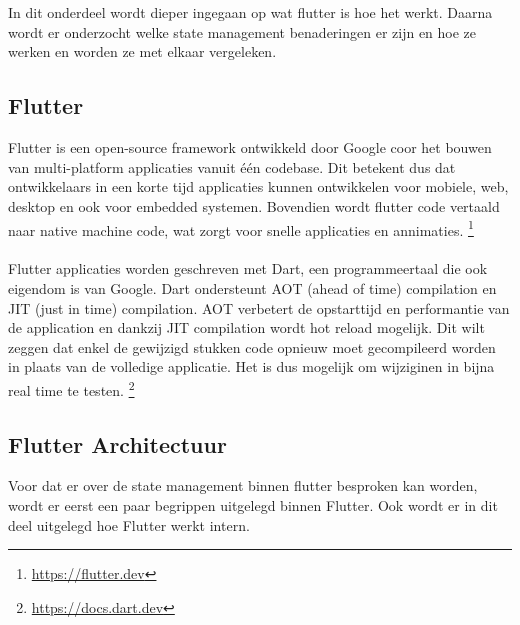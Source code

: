 \chapter{}%
\label{ch:stand-van-zaken}

In dit onderdeel wordt dieper ingegaan op wat flutter is hoe het werkt. Daarna wordt er onderzocht welke state management benaderingen er 
zijn en hoe ze werken en worden ze met elkaar vergeleken.

\section{{Flutter}}%
\label{sec:Flutter}
Flutter is een open-source framework ontwikkeld door Google coor het bouwen van multi-platform applicaties vanuit één codebase. 
Dit betekent dus dat ontwikkelaars in een korte tijd applicaties kunnen ontwikkelen voor mobiele, web, desktop en ook voor embedded systemen.
Bovendien wordt flutter code vertaald naar native machine code, wat zorgt voor snelle applicaties en annimaties. \footnote{\url{https://flutter.dev}}
\\
\\
Flutter applicaties worden geschreven met Dart, een programmeertaal die ook eigendom is van Google. Dart ondersteunt AOT (ahead of time) 
compilation en JIT (just in time) compilation. AOT verbetert de opstarttijd en performantie van de application en dankzij JIT compilation 
wordt hot reload mogelijk. Dit wilt zeggen dat enkel de gewijzigd stukken code opnieuw moet gecompileerd worden in plaats van de volledige applicatie.
Het is dus mogelijk om wijziginen in bijna real time te testen. \footnote{\url{https://docs.dart.dev}}

\section{Flutter Architectuur}
\label{sec:Flutter Architectuur}
Voor dat er over de state management binnen flutter besproken kan worden, wordt er eerst een paar begrippen uitgelegd binnen Flutter. Ook wordt er in dit deel
uitgelegd hoe Flutter werkt intern.

